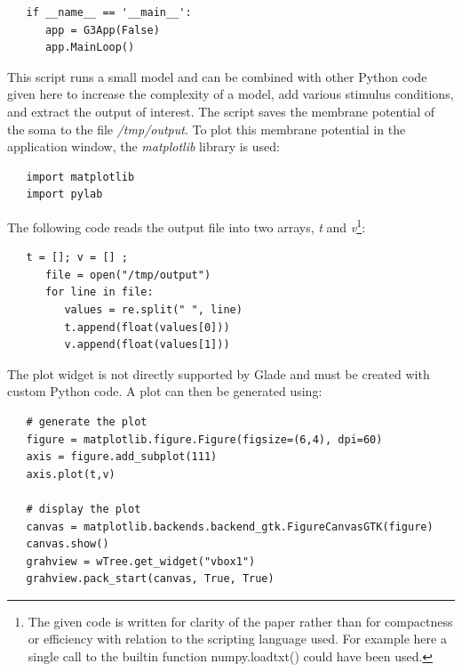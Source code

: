 \documentclass[12pt]{article}
\begin{document}

 {\footnotesize
   \resetlinenumber[14]
   \linenumbers
 \begin{verbatim}
   if __name__ == '__main__':
      app = G3App(False)
      app.MainLoop()
 \end{verbatim}
 }

This script runs a small model and can be combined with other Python
code given here to increase the complexity of a model, add various
stimulus conditions, and extract the output of interest.  The script
saves the membrane potential of the soma to the file {\it
  /tmp/output}.  To plot this membrane potential in the application
window, the {\it matplotlib} library is used:

{\footnotesize
  \resetlinenumber[5]
\begin{verbatim}
   import matplotlib
   import pylab
\end{verbatim}
}

The following code reads the output file into two arrays, {\it t} and
{\it v}\footnote{The given code is written for clarity of the paper
  rather than for compactness or efficiency with relation to the
  scripting language used.  For example here a single call to the
  builtin function numpy.loadtxt() could have been used.}:

{\footnotesize
  \resetlinenumber[5]
\begin{verbatim}
   t = []; v = [] ;
      file = open("/tmp/output")
      for line in file:
         values = re.split(" ", line)
         t.append(float(values[0]))
         v.append(float(values[1]))
\end{verbatim}
}

The plot widget is not directly supported by Glade and must be created
with custom Python code.  A plot can then be generated using:

{\footnotesize
  \resetlinenumber[5]
\begin{verbatim}
   # generate the plot
   figure = matplotlib.figure.Figure(figsize=(6,4), dpi=60)
   axis = figure.add_subplot(111)
   axis.plot(t,v)

   # display the plot
   canvas = matplotlib.backends.backend_gtk.FigureCanvasGTK(figure)
   canvas.show()
   grahview = wTree.get_widget("vbox1")
   grahview.pack_start(canvas, True, True)
\end{verbatim}
}
\end{document}
